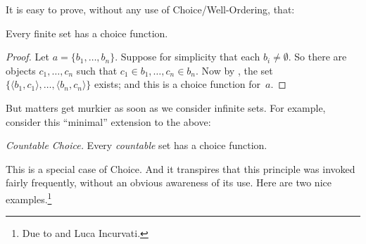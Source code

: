 \documentclass[../../../include/open-logic-section]{subfiles}
\begin{document}

It is easy to prove, without any use of Choice/Well-Ordering, that:

\begin{lem}[in $\Zminus$]
Every finite set has a choice function. 
\end{lem}

\begin{proof}
Let $a = \{b_1, \ldots, b_n\}$. Suppose for simplicity that each $b_i
\neq \emptyset$. So there are objects $c_1, \ldots, c_n$ such that
$c_1 \in b_1, \ldots, c_n \in b_n$. Now by
, the set $\{\langle b_1,
c_1\rangle , \ldots, \langle b_n, c_n\rangle\}$ exists; and this is a
choice function for~$a$.
\end{proof}

But matters get murkier as soon as we consider infinite sets. For
example, consider this ``minimal'' extension to the above:

\begin{defish}
\emph{Countable Choice.} Every \emph{countable} set has a choice function. 
\end{defish}

This is a special case of Choice. And it transpires that this
principle was invoked fairly frequently, without  an obvious awareness
of its use. Here are two nice examples.\footnote{Due to
\cite[\S9.4]{Potter2004} and Luca Incurvati.}
\end{document}
